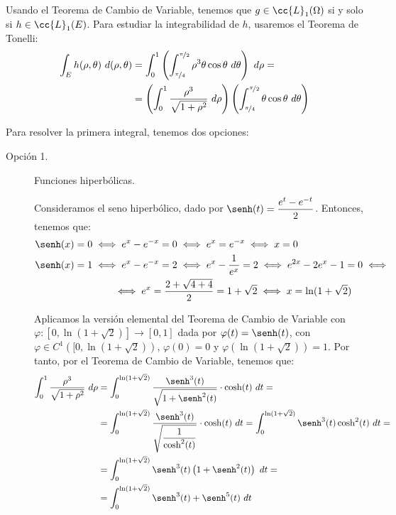 \begin{ejercicio}
    Usando el Teorema de Cambio de Variable, tenemos que $g\in \cc{L}_1(\Omega)$ si y solo si $h\in \cc{L}_1(E)$. Para estudiar la integrabilidad de $h$, usaremos el Teorema de Tonelli:
    \begin{align*}
        \int_E h(\rho, \theta)~d(\rho, \theta) &=
        \int_0^1 \left( \int_{\nicefrac{\pi}{4}}^{\nicefrac{\pi}{2}} \rho^3\theta\cos\theta~d\theta \right)~d\rho =\\
        &= \left( \int_0^1 \dfrac{\rho^3}{\sqrt{1+\rho^2}} ~d\rho \right) \left( \int_{\nicefrac{\pi}{4}}^{\nicefrac{\pi}{2}} \theta\cos\theta~d\theta \right)
    \end{align*}

    Para resolver la primera integral, tenemos dos opciones:
    \begin{description}
        \item[Opción 1.] Funciones hiperbólicas.
        
        Consideramos el seno hiperbólico, dado por $\senh(t)=\dfrac{e^t-e^{-t}}{2}$. Entonces, tenemos que:
        \begin{align*}
            \senh(x)=0 &\iff e^x-e^{-x}=0 \iff e^x = e^{-x} \iff x=0\\
            \senh(x)=1 &\iff e^x-e^{-x}=2 \iff e^x -\dfrac{1}{e^x}=2 \iff e^{2x}-2e^x-1=0 \iff \\&\qquad \iff e^x = \dfrac{2+\sqrt{4+4}}{2} = 1+\sqrt{2} \iff x = \ln(1+\sqrt{2})
        \end{align*}
        
        Aplicamos la versión elemental del Teorema de Cambio de Variable con $\varphi:\left[0,\ln(1+\sqrt{2})\right]\to [0,1]$ dada por $\varphi(t)=\senh(t)$, con $\varphi\in C^1\left([0,\ln(1+\sqrt{2})\right)$, $\varphi(0)=0$ y $\varphi\left(\ln(1+\sqrt{2})\right)=1$. Por tanto, por el Teorema de Cambio de Variable, tenemos que:
        \begin{align*}
            \int_0^1 \dfrac{\rho^3}{\sqrt{1+\rho^2}} ~d\rho &= \int_0^{\ln(1+\sqrt{2})} \dfrac{\senh^3(t)}{\sqrt{1+\senh^2(t)}}\cdot \cosh(t)~dt =\\
            &= \int_0^{\ln(1+\sqrt{2})} \dfrac{\senh^3(t)}{\sqrt{\dfrac{1}{\cosh^2(t)}}}\cdot \cosh(t)~dt
            = \int_0^{\ln(1+\sqrt{2})} \senh^3(t)\cosh^2(t)~dt =\\
            &= \int_0^{\ln(1+\sqrt{2})} \senh^3(t)\left(1+\senh^2(t)\right)~dt =\\
            &= \int_0^{\ln(1+\sqrt{2})} \senh^3(t) + \senh^5(t)~dt
        \end{align*}


\end{description}
\end{ejercicio}
